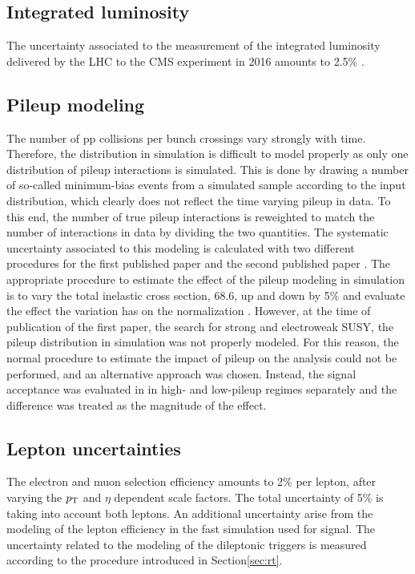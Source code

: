 \subsection*{Integrated luminosity} 
\noindent\justify
The uncertainty associated to the measurement of the integrated luminosity delivered by the LHC to the CMS experiment in 2016 amounts to 2.5\% \cite{CMS-PAS-LUM-17-001}.
\subsection*{Pileup modeling}
\noindent\justify
The number of pp collisions per bunch crossings vary strongly with time. 
Therefore, the distribution in simulation is difficult to model properly as only one distribution of pileup interactions is simulated. 
This is done by drawing a number of so-called minimum-bias events from a simulated sample according to the input distribution, which clearly does not reflect the time varying pileup in data. 
To this end, the number of true pileup interactions is reweighted to match the number of interactions in data by dividing the two quantities.
The systematic uncertainty associated to this modeling is calculated with two different procedures for the first published paper \cite{Sirunyan:2017qaj} and the second published paper \cite{Sirunyan:2018nwe}. 
The appropriate procedure to estimate the effect of the pileup modeling in simulation is to vary the total inelastic cross section, 68.6\mb, up and down by 5\% and evaluate the effect the variation has on the normalization \cite{Sirunyan:2018nqx}. 
However, at the time of publication of the first paper, the search for strong and electroweak SUSY, the pileup distribution in simulation was not properly modeled. 
For this reason, the normal procedure to estimate the impact of pileup on the analysis could not be performed, and an alternative approach was chosen. 
Instead, the signal acceptance was evaluated in in high- and low-pileup regimes separately and the difference was treated as the magnitude of the effect.
\subsection*{Lepton uncertainties} 
\noindent\justify
The electron and muon selection efficiency amounts to 2\% per lepton, after varying the $p_{\mathrm{T}}$ and $\eta$ dependent scale factors. 
The total uncertainty of 5\% is taking into account both leptons. An additional uncertainty arise from the modeling of the lepton efficiency in the fast simulation used for signal. 
The uncertainty related to the modeling of the dileptonic triggers is measured according to the procedure introduced in Section\ref{sec:rt}. 
